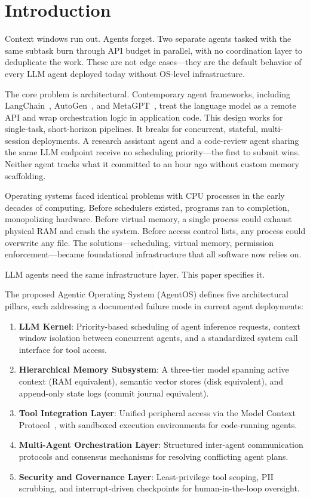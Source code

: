 \documentclass[journal]{IEEEtran}
\begin{document}
\section{Introduction}
\label{sec:intro}

Context windows run out. Agents forget. Two separate agents tasked with the same subtask burn through API budget in parallel, with no coordination layer to deduplicate the work. These are not edge cases---they are the default behavior of every LLM agent deployed today without OS-level infrastructure.

The core problem is architectural. Contemporary agent frameworks, including LangChain~\cite{chase2022langchain}, AutoGen~\cite{wu2023autogen}, and MetaGPT~\cite{hong2023metagpt}, treat the language model as a remote API and wrap orchestration logic in application code. This design works for single-task, short-horizon pipelines. It breaks for concurrent, stateful, multi-session deployments. A research assistant agent and a code-review agent sharing the same LLM endpoint receive no scheduling priority---the first to submit wins. Neither agent tracks what it committed to an hour ago without custom memory scaffolding.

Operating systems faced identical problems with CPU processes in the early decades of computing. Before schedulers existed, programs ran to completion, monopolizing hardware. Before virtual memory, a single process could exhaust physical RAM and crash the system. Before access control lists, any process could overwrite any file. The solutions---scheduling, virtual memory, permission enforcement---became foundational infrastructure that all software now relies on.

LLM agents need the same infrastructure layer. This paper specifies it.

The proposed Agentic Operating System (AgentOS) defines five architectural pillars, each addressing a documented failure mode in current agent deployments:
\begin{enumerate}
  \item \textbf{LLM Kernel}: Priority-based scheduling of agent inference requests, context window isolation between concurrent agents, and a standardized system call interface for tool access.
  \item \textbf{Hierarchical Memory Subsystem}: A three-tier model spanning active context (RAM equivalent), semantic vector stores (disk equivalent), and append-only state logs (commit journal equivalent).
  \item \textbf{Tool Integration Layer}: Unified peripheral access via the Model Context Protocol~\cite{anthropic2024mcp}, with sandboxed execution environments for code-running agents.
  \item \textbf{Multi-Agent Orchestration Layer}: Structured inter-agent communication protocols and consensus mechanisms for resolving conflicting agent plans.
  \item \textbf{Security and Governance Layer}: Least-privilege tool scoping, PII scrubbing, and interrupt-driven checkpoints for human-in-the-loop oversight.
\end{enumerate}
\end{document}
